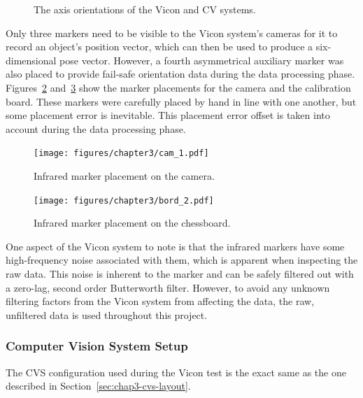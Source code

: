 \begin{figure}
  \centering
  \def\svgwidth{0.5\textwidth}
  
  \caption{The axis orientations of the Vicon and CV systems.}
\label{fig:chap3-cam-vicon-axes}
\end{figure}

Only three markers need to be visible to the Vicon system's cameras for it to record an object's position vector, which can then be used to produce a six-dimensional pose vector. However, a fourth asymmetrical auxiliary marker was also placed to provide fail-safe orientation data during the data processing phase. Figures~\ref{fig:chap3-cam-marker-placement} and~\ref{fig:chap3-board-marker-placement} show the marker placements for the camera and the calibration board. These markers were carefully placed by hand in line with one another, but some placement error is inevitable. This placement error offset is taken into account during the data processing phase. 

\begin{figure}
   \centering 
   \texttt{[image: figures/chapter3/cam\_1.pdf]}
   \caption{Infrared marker placement on the camera.}
\label{fig:chap3-cam-marker-placement}
\end{figure}

\begin{figure}
   \centering 
   \texttt{[image: figures/chapter3/bord\_2.pdf]}
   \caption{Infrared marker placement on the chessboard.}
\label{fig:chap3-board-marker-placement}
\end{figure}

One aspect of the Vicon system to note is that the infrared markers have some high-frequency noise associated with them, which is apparent when inspecting the raw data. This noise is inherent to the marker and can be safely filtered out with a zero-lag, second order Butterworth filter. However, to avoid any unknown filtering factors from the Vicon system from affecting the data, the raw, unfiltered data is used throughout this project. 

\subsubsection{Computer Vision System Setup}

The CVS configuration used during the Vicon test is the exact same as the one described in Section~\ref{sec:chap3-cvs-layout}.

